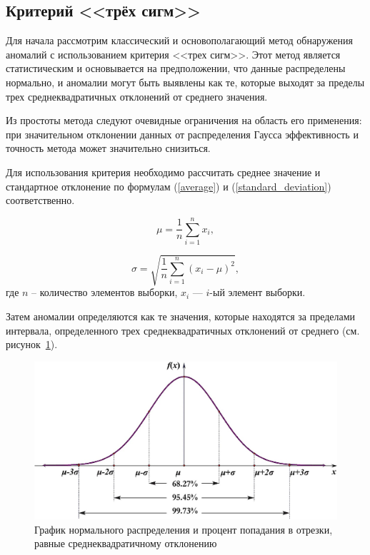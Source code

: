 \subsection{Критерий <<трёх сигм>>}

Для начала рассмотрим классический и основополагающий метод обнаружения аномалий с использованием критерия <<трех сигм>>. Этот метод является статистическим и основывается на предположении, что данные распределены нормально, и аномалии могут быть выявлены как те, которые выходят за пределы трех среднеквадратичных отклонений от среднего значения.

Из простоты метода следуют очевидные ограничения на область его применения: при значительном отклонении данных от распределения Гаусса эффективность и точность метода может значительно снизиться.

Для использования критерия необходимо рассчитать среднее значение и стандартное отклонение по формулам (\ref{average}) и (\ref{standard_deviation}) соответственно.

\begin{equation}\label{average}
    \mu = \frac{1}{n} \sum\limits_{i = 1}^{n}x_i,
\end{equation}

\begin{equation}\label{standard_deviation}
    \sigma = \sqrt{\frac{1}{n} \sum\limits_{i = 1}^{n}(x_i - \mu)^2},
\end{equation}
где $n$ – количество элементов выборки, $x_i$ --- $i$-ый элемент выборки.

Затем аномалии определяются как те значения, которые находятся за пределами интервала, определенного трех среднеквадратичных отклонений от среднего (см. рисунок~\ref{fig:three-sigma}).

\begin{figure}
  \centering
  \includegraphics[scale=0.3]{inc/images/three-sigma.png}
  \caption{График нормального распределения и процент попадания в отрезки, равные среднеквадратичному отклонению \cite{Three-Sigma-Limits}}
  \label{fig:three-sigma}
\end{figure}

